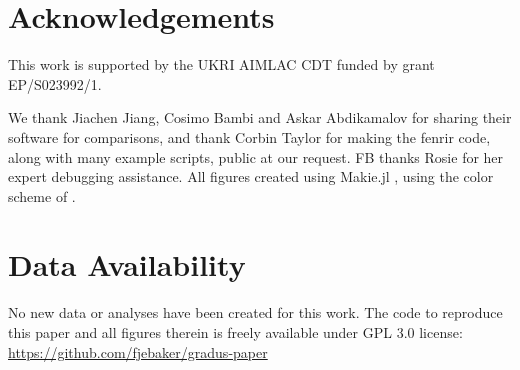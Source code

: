 \documentclass[fleqn,usenatbib]{mnras}
\newcommand{\software}[1]{{\sc #1}}
\begin{document}
\section*{Acknowledgements}
This work is supported by the UKRI AIMLAC CDT funded by grant EP/S023992/1.

We thank Jiachen Jiang, Cosimo Bambi and Askar Abdikamalov for sharing their
software for comparisons, and thank Corbin Taylor for making the \software{fenrir}
code, along with many example scripts, public at our request. FB thanks Rosie
for her expert debugging assistance. All figures created using Makie.jl
\citep{DanischKrumbiegel2021}, using the color scheme of
\citet{wong_points_2011}.

\section*{Data Availability}

No new data or analyses have been created for this work. The code to reproduce
this paper and all figures therein is freely available under GPL 3.0 license:
\url{https://github.com/fjebaker/gradus-paper}










\appendix



% 
% 
% 
% 




\bsp    %
\label{lastpage}
\end{document}
